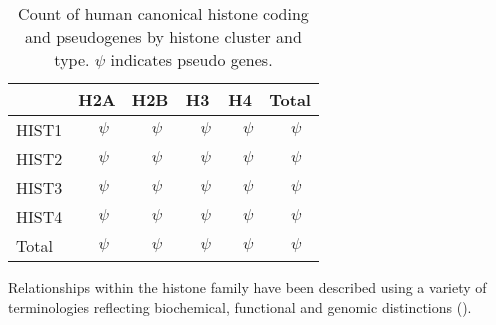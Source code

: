 \begin{table*}[hp]
	\caption{
	Count of human canonical histone coding and pseudogenes by histone cluster and type.
	$\psi$ indicates pseudo genes.}
	\label{tab:histone-gene-count}
	\centering
	\begin{tabular}{l r@{ + }l<{$\psi$} r@{ + }l<{$\psi$} r@{ + }l<{$\psi$} r@{ + }l<{$\psi$} r@{ + }l<{$\psi$}}
		\toprule
		\null   & \multicolumn{2}{c}{H2A}  & \multicolumn{2}{c}{H2B}
			& \multicolumn{2}{c}{H3}   & \multicolumn{2}{c}{H4}
			& \multicolumn{2}{c}{Total} \\
		\midrule
		HIST1   & \HTwoACodingInHISTOne{}     & \HTwoAPseudoInHISTOne{}
			& \HTwoBCodingInHISTOne{}     & \HTwoBPseudoInHISTOne{}
			& \HThreeCodingInHISTOne{}    & \HThreePseudoInHISTOne{}
			& \HFourCodingInHISTOne{}     & \HFourPseudoInHISTOne{}
			& \CodingGenesInHISTOne{}     & \PseudoGenesInHISTOne{} \\
		HIST2   & \HTwoACodingInHISTTwo{}     & \HTwoAPseudoInHISTTwo{}
			& \HTwoBCodingInHISTTwo{}     & \HTwoBPseudoInHISTTwo{}
			& \HThreeCodingInHISTTwo{}    & \HThreePseudoInHISTTwo{}
			& \HFourCodingInHISTTwo{}     & \HFourPseudoInHISTTwo{}
			& \CodingGenesInHISTTwo{}     & \PseudoGenesInHISTTwo{} \\
		HIST3   & \HTwoACodingInHISTThree{}   & \HTwoAPseudoInHISTThree{}
			& \HTwoBCodingInHISTThree{}   & \HTwoBPseudoInHISTThree{}
			& \HThreeCodingInHISTThree{}  & \HThreePseudoInHISTThree{}
			& \HFourCodingInHISTThree{}   & \HFourPseudoInHISTThree{}
			& \CodingGenesInHISTThree{}   & \PseudoGenesInHISTThree{} \\
		HIST4   & \HTwoACodingInHISTFour{}    & \HTwoAPseudoInHISTFour{}
			& \HTwoBCodingInHISTFour{}    & \HTwoBPseudoInHISTFour{}
			& \HThreeCodingInHISTFour{}   & \HThreePseudoInHISTFour{}
			& \HFourCodingInHISTFour{}    & \HFourPseudoInHISTFour{}
			& \CodingGenesInHISTFour{}  & \PseudoGenesInHISTFour{} \\
		\addlinespace
		Total   & \HTwoACodingGenes{}       & \HTwoAPseudoGenes{}
			& \HTwoBCodingGenes{}       & \HTwoBPseudoGenes{}
			& \HThreeCodingGenes{}      & \HThreePseudoGenes{}
			& \HFourCodingGenes{}       & \HFourPseudoGenes{}
			& \TotalCodingGenes{}       & \TotalPseudoGenes{} \\
		\bottomrule
	\end{tabular}
\end{table*}

	Relationships within the histone family have been described using a variety of terminologies
	reflecting biochemical, functional and genomic distinctions ().

